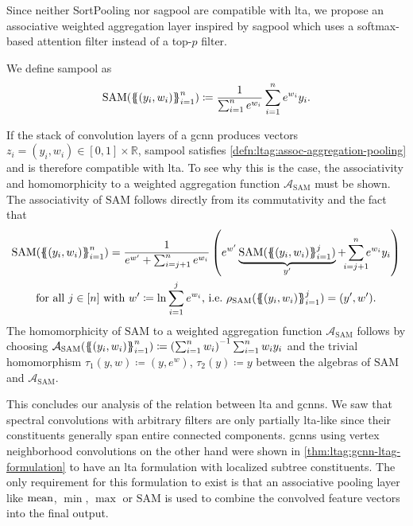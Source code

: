 Since neither SortPooling nor \ac{sagpool} are compatible with \ac{lta}, we propose an associative weighted aggregation layer inspired by \ac{sagpool} which uses a softmax-based attention filter instead of a top-$p$ filter.
\begin{defn}\label{defn:ltag:sam-pool}
	We define \ac{sampool} as
	\[\mathrm{SAM}({\ldblbrace (y_i, w_i) \rdblbrace}_{i=1}^n) \coloneqq\frac{1}{\sum_{i=1}^n e^{w_i}} \sum_{i=1}^n e^{w_i} y_i \text{.}\]
\end{defn}
If the stack of convolution layers of a \ac{gcnn} produces vectors $z_i = (y_i, w_i) \in [0, 1] \times \mathbb{R}$, \ac{sampool} satisfies \cref{defn:ltag:assoc-aggregation-pooling} and is therefore compatible with \acs{lta}.
To see why this is the case, the associativity and homomorphicity to a weighted aggregation function $\mathcal{A}_{\mathrm{SAM}}$ must be shown.
The associativity of $\mathrm{SAM}$ follows directly from its commutativity and the fact that
\begin{gather*}
	\mathrm{SAM}({\ldblbrace (y_i, w_i) \rdblbrace}_{i=1}^n) = \frac{1}{e^{w'} + \sum_{i=j+1}^n e^{w_i}} \left( e^{w'} \underbrace{\mathrm{SAM}({\ldblbrace (y_i, w_i) \rdblbrace}_{i=1}^j)}_{y'} + \smashoperator{\sum_{i=j+1}^n} e^{w_i} y_i \right) \\
	\text{for all } j \in [n] \text{ with } w' \coloneqq \ln\sum_{i=1}^{j} e^{w_i} \text{, i.e.\ } \rho_{\mathrm{SAM}}({\ldblbrace (y_i, w_i) \rdblbrace}_{i=1}^j) = (y', w')\text{.}
\end{gather*}
The homomorphicity of $\mathrm{SAM}$ to a weighted aggregation function $\mathcal{A}_{\mathrm{SAM}}$ follows by choosing $\mathcal{A}_{\mathrm{SAM}}({\ldblbrace (y_i, w_i) \rdblbrace}_{i=1}^n) \coloneqq {\left(\sum_{i=1}^n w_i\right)}^{-1} \sum_{i=1}^n w_i y_i$ and the trivial homomorphism $\tau_1(y, w) \coloneqq (y, e^w)$, $\tau_2(y) \coloneqq y$ between the algebras of $\mathrm{SAM}$ and $\mathcal{A}_{\mathrm{SAM}}$.

This concludes our analysis of the relation between \ac{lta} and \acp{gcnn}.
We saw that spectral convolutions with arbitrary filters are only partially \acs{lta}-like since their constituents generally span entire connected components.
\Acp{gcnn} using vertex neighborhood convolutions on the other hand were shown in \cref{thm:ltag:gcnn-ltag-formulation} to have an \ac{lta} formulation with localized subtree constituents.
The only requirement for this formulation to exist is that an associative pooling layer like $\operatorname{mean}$, $\min$, $\max$ or $\mathrm{SAM}$ is used to combine the convolved feature vectors into the final output.
